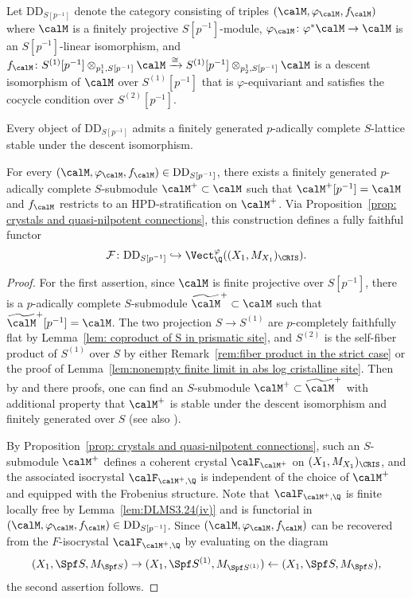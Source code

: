 Let $\mathrm{DD}_{S[p^{-1}]}$ denote the category consisting of triples $(\calM,\varphi_{\calM},f_{\calM})$ where $\calM$ is a finitely projective $S[p^{-1}]$-module, $\varphi_{\calM}\colon \varphi^\ast \calM \to \calM$ is an $S[p^{-1}]$-linear isomorphism, and $f_{\calM}\colon S^{(1)}[p^{-1}]\otimes_{p_1^1,S[p^{-1}]}\calM\xrightarrow{\cong}S^{(1)}[p^{-1}]\otimes_{p_2^1,S[p^{-1}]}\calM$ is a descent isomorphism of $\calM$ over $S^{(1)}[p^{-1}]$ that is $\varphi$-equivariant and satisfies the cocycle condition over $S^{(2)}[p^{-1}]$.

Every object of $\mathrm{DD}_{S[p^{-1}]}$ admits a finitely generated $p$-adically complete $S$-lattice stable under the descent isomorphism.

\begin{lem}\label{lem:S-lattice of rational DD}
For every $(\calM,\varphi_{\calM},f_{\calM})\in \mathrm{DD}_{S[p^{-1}]}$, there exists a finitely generated $p$-adically complete $S$-submodule $\calM^+\subset\calM$ such that $\calM^+[p^{-1}]=\calM$ and $f_\calM$ restricts to an HPD-stratification on $\calM^+$. Via Proposition~\ref{prop: crystals and quasi-nilpotent connections}, this construction defines a fully faithful functor
\[
\mathcal{F} \colon\mathrm{DD}_{S[p^{-1}]} \hookrightarrow\Vect_\Q^\varphi((X_1,M_{X_1})_\CRIS). 
\]
\end{lem}

\begin{proof}
For the first assertion, since $\calM$ is finite projective over $S[p^{-1}]$, there is a $p$-adically complete $S$-submodule $\widetilde{\calM}^+\subset\calM$ such that $\widetilde{\calM}^+[p^{-1}]=\calM$. The two projection $S\to S^{(1)}$ are $p$-completely faithfully flat by Lemma~\ref{lem: coproduct of S in prismatic site}, and $S^{(2)}$ is the self-fiber product of $S^{(1)}$ over $S$ by either Remark~\ref{rem:fiber product in the strict case} or the proof of Lemma~\ref{lem:nonempty finite limit in abs log cristalline site}. Then by \cite[Prop.~2.8 and Cor.~2.5]{drinfeld-stackycrystal} and there proofs, one can find an $S$-submodule $\calM^+\subset \widetilde{\calM}^+$ with additional property that $\calM^+$ is stable under the descent isomorphism and finitely generated over $S$ (see also \cite[Lem.~3.4]{BoschGortz-rigiddescent}).

By Proposition~\ref{prop: crystals and quasi-nilpotent connections}, such an $S$-submodule $\calM^+$ defines a coherent crystal $\calF_{\calM^+}$ on $(X_1,M_{X_1})_\CRIS$, and the associated isocrystal $\calF_{\calM^+,\Q}$ is independent of the choice of $\calM^+$ and equipped with the Frobenius structure. Note that $\calF_{\calM^+,\Q}$ is finite locally free by Lemma~\ref{lem:DLMS3.24(iv)} and is functorial in $(\calM,\varphi_{\calM},f_{\calM})\in \mathrm{DD}_{S[p^{-1}]}$. Since $(\calM,\varphi_{\calM},f_{\calM})$ can be recovered from the $F$-isocrystal $\calF_{\calM^+,\Q}$ by evaluating on the diagram 
    \[
    (X_1, \Spf S,M_{\Spf S}) \rightarrow (X_1, \Spf S^{(1)},M_{\Spf S^{(1)}})\leftarrow (X_1, \Spf S,M_{\Spf S}),
    \]
the second assertion follows.
\end{proof}


